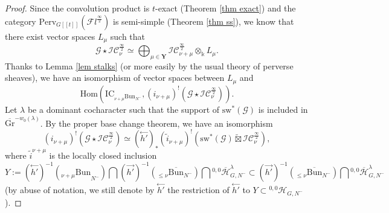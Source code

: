 \documentclass[11pt]{amsart}
\theoremstyle{plain}
\theoremstyle{remark}
\numberwithin{equation}{section}
\begin{document}
	\begin{proof}
		 Since the convolution product is $t$-exact (Theorem \ref{thm exact}) and the category $\mathrm{Perv}_{G[[t]]}(\mathcal{F}l^\frac{\infty}{2})$ is semi-simple (Theorem \ref{thm ss}), we know that there exist vector spaces $L_\mu$ such that 
     \begin{equation}\label{hom space}
			\mathcal{G}\star\mathcal{IC}^{\frac{\infty}{2}}_\nu\simeq \bigoplus_{\mu\in\mathbf{Y}}\mathcal{IC}^{\frac{\infty}{2}}_{\nu+\mu}\otimes_\mathbb{k}L_\mu.  
		\end{equation}
Thanks to Lemma \ref{lem stalks} (or more easily by the usual theory of perverse sheaves), we have an isomorphism of vector spaces	between $L_\mu$ and	
		\begin{equation}\label{hom space 2}
			\mathrm{Hom}(\mathrm{IC}_{_{\nu+\mu}\mathrm{Bun}_{N^-}},(i_{\nu+\mu})^!(\mathcal{G}\star\mathcal{IC}^{\frac{\infty}{2}}_\nu)). 
		\end{equation}
		Let $\lambda$ be a dominant cocharacter such that the support of $\mathrm{sw}^*(\mathcal{G})$ is included in $\overline{\mathrm{Gr}}^{-w_0(\lambda)}$. By the proper base change theorem, we have an isomorphism $$(i_{\nu+\mu})^!(\mathcal{G}\star\mathcal{IC}^{\frac{\infty}{2}}_\nu)\simeq (\overset{\leftarrow}{h'})_*(\tilde{i}_{\nu+\mu})^!(\mathrm{sw}^*(\mathcal{G})\widetilde{\boxtimes}\mathcal{IC}^{\frac{\infty}{2}}_\nu), $$
		where $\tilde{i}^{\nu+\mu}$ is the locally closed inclusion 
		$$Y:=(\overset{\leftarrow}{h'})^{-1}({_{\nu+\mu}\mathrm{Bun}}_{N^-})\bigcap (\overset{\rightarrow}{h'})^{-1}({_{\leq \nu}\overline{\mathrm{Bun}}_{N^-}})\bigcap {^{0,0}\overline{\mathcal{H}}^\lambda_{G,N^-}}\subset  (\overset{\rightarrow}{h'})^{-1}({_{\leq \nu}\overline{\mathrm{Bun}}_{N^-}})\bigcap {^{0,0}\overline{\mathcal{H}}^\lambda_{G,N^-}}$$
		(by abuse of notation, we still denote by $\overset{\leftarrow}{h'}$ the restriction of $\overset{\leftarrow}{h'}$ to $Y\subset {^{0,0}\mathcal{H}_{G,N^{-}}}$).
		

\end{proof}
\end{document}

